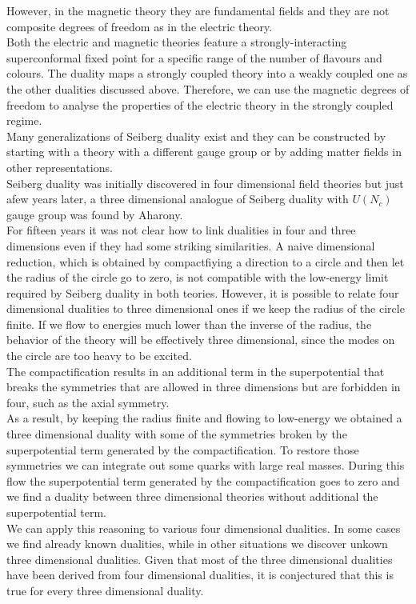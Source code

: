 However, in the magnetic theory they are fundamental fields and they are not composite degrees of freedom as in the electric theory.\\
Both the electric and magnetic theories feature a strongly-interacting superconformal fixed point for a specific range of the number of flavours and colours. 
The duality maps a strongly coupled theory into a weakly coupled one as the other dualities discussed above. 
Therefore, we can use the magnetic degrees of freedom to analyse the properties of the electric theory in the strongly coupled regime.\\
Many generalizations of Seiberg duality exist and they can be constructed by starting with a theory with a different gauge group or by adding matter fields in other representations.
\\
Seiberg duality was initially discovered in four dimensional field theories but just afew years later, a three dimensional analogue of Seiberg duality with $U(N_c)$ gauge group was found by Aharony.\\

For fifteen years it was not clear how to link dualities in four and three dimensions even if they had some striking similarities. 
A naive dimensional reduction, which is obtained by compactfiying a direction to a circle and then let the radius of the circle go to zero, is not compatible with the low-energy limit required by Seiberg duality in both teories.  
However, it is possible to relate four dimensional dualities to three dimensional ones if we keep the radius of the circle finite. 
If we flow to energies much lower than the inverse of the radius, the behavior of the theory will be effectively three dimensional, since the modes on the circle are too heavy to be excited.\\
The compactification results in an additional term in the superpotential that breaks the symmetries that are allowed in three dimensions but are forbidden in four, such as the axial symmetry.\\
As a result, by keeping the radius finite and flowing to low-energy we obtained a three dimensional duality with some of the symmetries broken by the superpotential term generated by the compactification. 
To restore those symmetries we can integrate out some quarks with large real masses. During this flow the superpotential term generated by the compactification goes to zero and we find a duality between three dimensional theories without additional the superpotential term.\\
We can apply this reasoning to various four dimensional dualities. 
In some cases we find already known dualities, while in other situations we discover unkown three dimensional dualities. 
Given that most of the three dimensional dualities have been derived from four dimensional dualities, it is conjectured that this is true for every three dimensional duality.\\

